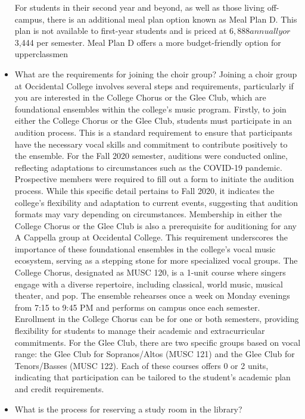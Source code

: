 \documentclass[10pt,twocolumn]{article}
\begin{document}
\begin{itemize}
For students in their second year and beyond, as well as those living off-campus, there is an additional meal plan option known as Meal Plan D. This plan is not available to first-year students and is priced at $6,888 annually or $3,444 per semester. Meal Plan D offers a more budget-friendly option for upperclassmen
\newline
\item What are the requirements for joining the choir group?
Joining a choir group at Occidental College involves several steps and requirements, particularly if you are interested in the College Chorus or the Glee Club, which are foundational ensembles within the college's music program. Firstly, to join either the College Chorus or the Glee Club, students must participate in an audition process. This is a standard requirement to ensure that participants have the necessary vocal skills and commitment to contribute positively to the ensemble. For the Fall 2020 semester, auditions were conducted online, reflecting adaptations to circumstances such as the COVID-19 pandemic. Prospective members were required to fill out a form to initiate the audition process. While this specific detail pertains to Fall 2020, it indicates the college's flexibility and adaptation to current events, suggesting that audition formats may vary depending on circumstances. Membership in either the College Chorus or the Glee Club is also a prerequisite for auditioning for any A Cappella group at Occidental College. This requirement underscores the importance of these foundational ensembles in the college's vocal music ecosystem, serving as a stepping stone for more specialized vocal groups. The College Chorus, designated as MUSC 120, is a 1-unit course where singers engage with a diverse repertoire, including classical, world music, musical theater, and pop. The ensemble rehearses once a week on Monday evenings from 7:15 to 9:45 PM and performs on campus once each semester. Enrollment in the College Chorus can be for one or both semesters, providing flexibility for students to manage their academic and extracurricular commitments. For the Glee Club, there are two specific groups based on vocal range: the Glee Club for Sopranos/Altos (MUSC 121) and the Glee Club for Tenors/Basses (MUSC 122). Each of these courses offers 0 or 2 units, indicating that participation can be tailored to the student's academic plan and credit requirements.
\newline
\item What is the process for reserving a study room in the library?

\end{itemize}
\end{document}
